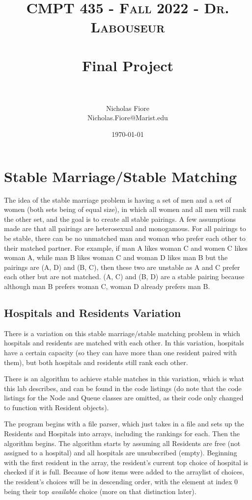 \documentclass[letterpaper, 10pt,DIV=13]{scrartcl}
\title{	
   \normalfont \normalsize 
   \textsc{CMPT 435 - Fall 2022 - Dr. Labouseur} \\[10pt] %
   \horrule{0.5pt} \\[0.25cm] 	%
   \huge Final Project  \\     	    %
   \horrule{0.5pt} \\[0.25cm] 	%
}
\author{Nicholas Fiore \\ \normalsize Nicholas.Fiore@Marist.edu}
\date{\normalsize\today} 	%
\numberwithin{equation}{section} %
\numberwithin{figure}{section} %
\numberwithin{table}{section} %
\begin{document}
\maketitle %

\section{Stable Marriage/Stable Matching}
The idea of the stable marriage problem is having a set of men and a set of women (both sets being of equal size), in which all women and all men will rank the other set, and the goal is to create all stable pairings. A few assumptions made are that all pairings are heterosexual and monogamous. For all pairings to be stable, there can be no unmatched man and woman who prefer each other to their matched partner. For example, if man A likes woman C and women C likes woman A, while man B likes woman C and woman D likes man B but the pairings are (A, D) and (B, C), then these two are unstable as A and C prefer each other but are not matched. (A, C) and (B, D) are a stable pairing because although man B prefers woman C, woman D already prefers man B.

\subsection{Hospitals and Residents Variation}
There is a variation on this stable marriage/stable matching problem in which hospitals and residents are matched with each other. In this variation, hospitals have a certain capacity (so they can have more than one resident paired with them), but both hospitals and residents still rank each other. 

There is an algorithm to achieve stable matches in this variation, which is what this lab describes, and can be found in the code listings (do note that the code listings for the Node and Queue classes are omitted, as their code only changed to function with Resident objects).

The program begins with a file parser, which just takes in a file and sets up the Residents and Hospitals into arrays, including the rankings for each. Then the algorithm begins. The algorithm starts by assuming all Residents are free (not assigned to a hospital) and all hospitals are unsubscribed (empty). Beginning with the first resident in the array, the resident's current top choice of hospital is checked if it is full. Because of how items were added to the arraylist of choices, the resident's choices will be in descending order, with the element at index 0 being their top \textit{available} choice (more on that distinction later).
\end{document}
